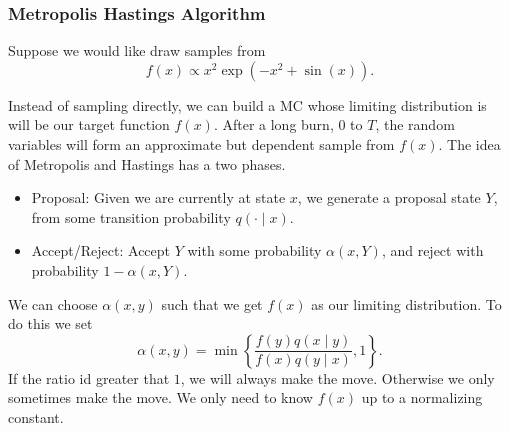 \subsubsection*{Metropolis Hastings Algorithm}

\begin{exam} \label{exam: MC_samp_1}
    Suppose we would like draw samples from
    \[
        f(x) \propto x^2 \exp \left( -x^2 + \sin (x) \right).
    \]
\end{exam}

Instead of sampling directly, we can build a MC whose limiting distribution is will be our target function $f(x)$. After a long burn, $0$ to $T$, the random variables will form an approximate but dependent sample from $f(x)$. The idea of Metropolis and Hastings has a two phases.
\begin{itemize}
    \item Proposal: Given we are currently at state $x$, we generate a proposal state $Y$, from some transition probability $q(\cdot  \mid x)$.
    \item Accept/Reject: Accept $Y$ with some probability $\alpha (x,Y)$, and reject with probability $1 - \alpha (x,Y)$.
\end{itemize}
We can choose $\alpha (x,y)$ such that we get $f(x)$ as our limiting distribution. To do this we set
\[
    \alpha (x,y) = \min \left\{
    \frac{f(y) q(x \mid y)}{f(x) q(y \mid x)} , 1
    \right\}.
\]
If the ratio id greater that $1$, we will always make the move. Otherwise we only sometimes make the move. We only need to know $f(x)$ up to a normalizing constant.

